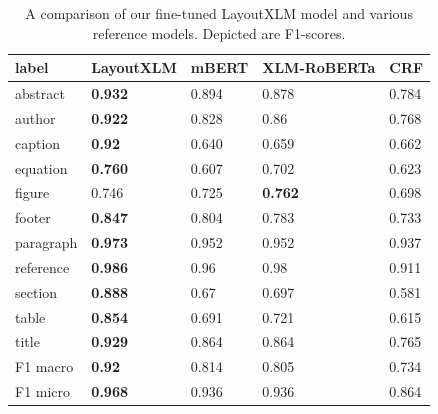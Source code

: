\begin{table}[!ht]
\centering
\begin{tabular}{|l|
>{\columncolor[HTML]{DAE8FC}}l |
>{\columncolor[HTML]{EFEFEF}}l |
>{\columncolor[HTML]{DAE8FC}}l |
>{\columncolor[HTML]{EFEFEF}}l |}
\hline
\textbf{label}     & \textbf{LayoutXLM} & \textbf{mBERT} & \textbf{XLM-RoBERTa} & \textbf{CRF} \\ \hline\hline
abstract           & \textbf{0.932}     & 0.894          & 0.878                & 0.784        \\ \hline
author             & \textbf{0.922}     & 0.828          & 0.86                 & 0.768        \\ \hline
caption            & \textbf{0.92}      & 0.640          & 0.659                & 0.662        \\ \hline
equation           & \textbf{0.760}     & 0.607          & 0.702                & 0.623        \\ \hline
figure             & 0.746              & 0.725          & \textbf{0.762}       & 0.698        \\ \hline
footer             & \textbf{0.847}     & 0.804          & 0.783                & 0.733        \\ \hline
paragraph          & \textbf{0.973}     & 0.952          & 0.952                & 0.937        \\ \hline
reference          & \textbf{0.986}     & 0.96           & 0.98                 & 0.911        \\ \hline
section            & \textbf{0.888}     & 0.67           & 0.697                & 0.581        \\ \hline
table              & \textbf{0.854}     & 0.691          & 0.721                & 0.615        \\ \hline
title              & \textbf{0.929}     & 0.864          & 0.864                & 0.765        \\ \hline\hline
F1 macro           & \textbf{0.92}      & 0.814          & 0.805                & 0.734        \\ \hline
F1 micro           & \textbf{0.968}     & 0.936          & 0.936                & 0.864        \\ \hline
\end{tabular}
\caption{A comparison of our fine-tuned LayoutXLM model and various reference models. Depicted are F1-scores.}
\label{tab:results_document_segment_compare}
\end{table}

